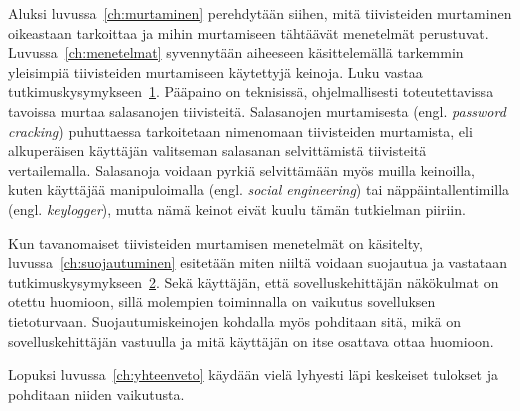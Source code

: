 Aluksi luvussa~\ref{ch:murtaminen} perehdytään siihen, mitä tiivisteiden murtaminen oikeastaan tarkoittaa ja mihin murtamiseen tähtäävät menetelmät perustuvat. Luvussa~\ref{ch:menetelmat} syvennytään aiheeseen käsittelemällä tarkemmin yleisimpiä tiivisteiden murtamiseen käytettyjä keinoja. Luku vastaa tutkimuskysymykseen~\hyperref[rq1]{1}. Pääpaino on teknisissä, ohjelmallisesti toteutettavissa tavoissa murtaa salasanojen tiivisteitä. Salasanojen murtamisesta (engl. \textit{password cracking}) puhuttaessa tarkoitetaan nimenomaan tiivisteiden murtamista, eli alkuperäisen käyttäjän valitseman salasanan selvittämistä tiivisteitä vertailemalla. Salasanoja voidaan pyrkiä selvittämään myös muilla keinoilla, kuten käyttäjää manipuloimalla (engl. \textit{social engineering}) tai näppäintallentimilla (engl. \textit{keylogger}), mutta nämä keinot eivät kuulu tämän tutkielman piiriin.

Kun tavanomaiset tiivisteiden murtamisen menetelmät on käsitelty, luvussa~\ref{ch:suojautuminen} esitetään miten niiltä voidaan suojautua ja vastataan tutkimuskysymykseen~\hyperref[rq2]{2}. Sekä käyttäjän, että sovelluskehittäjän näkökulmat on otettu huomioon, sillä molempien toiminnalla on vaikutus sovelluksen tietoturvaan. Suojautumiskeinojen kohdalla myös pohditaan sitä, mikä on sovelluskehittäjän vastuulla ja mitä käyttäjän on itse osattava ottaa huomioon.

Lopuksi luvussa~\ref{ch:yhteenveto} käydään vielä lyhyesti läpi keskeiset tulokset ja pohditaan niiden vaikutusta.

